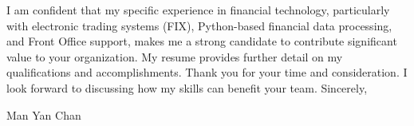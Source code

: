 \documentclass[11pt, a4paper]{article} %
\begin{document}
I am confident that my specific experience in financial technology, particularly with electronic trading systems (FIX), Python-based financial data processing, and Front Office support, makes me a strong candidate to contribute significant value to your organization. My resume provides further detail on my qualifications and accomplishments. Thank you for your time and consideration. I look forward to discussing how my skills can benefit your team.
\medskip %
Sincerely,

\vspace{3\baselineskip} %

Man Yan Chan %

\end{document}
